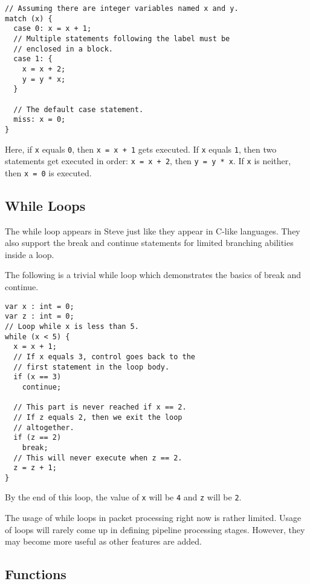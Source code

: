 \begin{codepage}
\begin{lstlisting}
// Assuming there are integer variables named x and y.
match (x) {
  case 0: x = x + 1;
  // Multiple statements following the label must be
  // enclosed in a block.
  case 1: {
    x = x + 2;
    y = y * x;
  }

  // The default case statement.
  miss: x = 0;
}
\end{lstlisting}
\end{codepage}

Here, if \texttt{x} equals \texttt{0}, then \texttt{x = x + 1} gets executed. If
\texttt{x} equals \texttt{1}, then two statements get executed in order:
\texttt{x = x + 2}, then \texttt{y = y * x}. If \texttt{x} is neither, then
\texttt{x = 0} is executed.

\subsection{While Loops} \label{tut:while}

The while loop appears in Steve just like they appear in C-like languages. 
They also support the break and continue statements for limited
branching abilities inside a loop.

The following is a trivial while loop which demonstrates the basics
of break and continue.

\begin{codepage}
\begin{lstlisting}
var x : int = 0;
var z : int = 0;
// Loop while x is less than 5.
while (x < 5) {
  x = x + 1;
  // If x equals 3, control goes back to the
  // first statement in the loop body.
  if (x == 3)
    continue;

  // This part is never reached if x == 2.
  // If z equals 2, then we exit the loop
  // altogether.
  if (z == 2)
    break;
  // This will never execute when z == 2.
  z = z + 1;
}
\end{lstlisting}
\end{codepage}

By the end of this loop, the value of \texttt{x} will be \texttt{4} and \texttt{z} will be \texttt{2}.

The usage of while loops in packet processing right now is rather limited. Usage
of loops will rarely come up in defining pipeline processing stages. However,
they may become more useful as other features are added.

\subsection{Functions} \label{tut:function}

